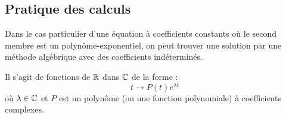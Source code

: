 \subsection{Pratique des calculs}
Dans le cas particulier d'une équation à coefficients constants où le second membre est un polynôme-exponentiel, on peut trouver une solution par une méthode algébrique avec des coefficients indéterminés.
\begin{defi}
 Il s'agit de fonctions de $\mathbb{R}$ dans $\mathbb{C}$ de la forme :
\begin{displaymath}
 t \rightarrow P(t)e^{\lambda t}
\end{displaymath}
où $\lambda\in \mathbb{C}$ et $P$ est un polynôme (ou une fonction polynomiale) à coefficients complexes.
\end{defi}

